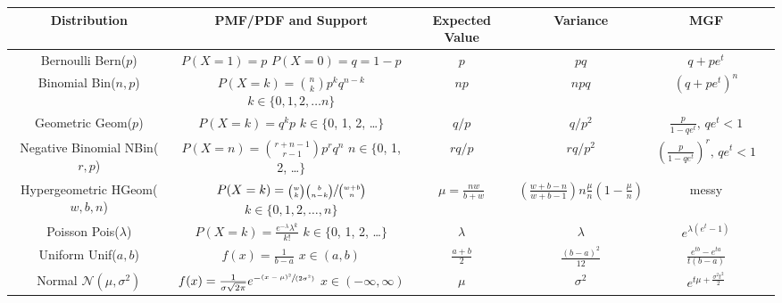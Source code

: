 \documentclass[10pt,landscape]{article}
\newcommand{\N}{\mathcal{N}}
\newcommand{\Bern}{\textrm{Bern}}
\newcommand{\Bin}{\textrm{Bin}}
\newcommand{\Pois}{\textrm{Pois}}
\newcommand{\Unif}{\textrm{Unif}}
\newcommand{\Geom}{\textrm{Geom}}
\newcommand{\NBin}{\textrm{NBin}}
\newcommand{\Hypergeometric}{\textrm{HGeom}}
\begin{document}
\begin{center}
\renewcommand{\arraystretch}{3.7}
\begin{tabular}{cccccc}
\textbf{Distribution} & \textbf{PMF/PDF and Support} & \textbf{Expected Value}  & \textbf{Variance} & \textbf{MGF}\\
\hline 
\shortstack{Bernoulli \\ \Bern($p$)} & \shortstack{$P(X=1) = p$ \\$ P(X=0) = q=1-p$} & $p$ & $pq$ & $q + pe^t$ \\
\hline
\shortstack{Binomial \\ \Bin($n, p$)} & \shortstack{$P(X=k) = {n \choose k}p^k q^{n-k}$  \\ $k \in \{0, 1, 2, \dots n\}$}& $np$ & $npq$ & $(q + pe^t)^n$ \\
\hline
\shortstack{Geometric \\ \Geom($p$)} & \shortstack{$P(X=k) = q^kp$  \\ $k \in \{$0, 1, 2, \dots $\}$}& $q/p$ & $q/p^2$ & $\frac{p}{1-qe^t}, \, qe^t < 1$\\
\hline
\shortstack{Negative Binomial \\ \NBin($r, p$)} & \shortstack{$P(X=n) = {r + n - 1 \choose r -1}p^rq^n$ \\ $n \in \{$0, 1, 2, \dots $\}$} & $rq/p$ & $rq/p^2$ &  $(\frac{p}{1-qe^t})^r, \, qe^t < 1$\\
\hline
\shortstack{Hypergeometric \\ \Hypergeometric($w, b, n$)} & \shortstack{$P(X=k) = \sfrac{{w \choose k}{b \choose n-k}}{{w + b \choose n}}$ \\ $k \in \{0, 1, 2, \dots,  n\}$} & $\mu = \frac{nw}{b+w}$ &$\left(\frac{w+b-n}{w+b-1} \right) n\frac{\mu}{n}(1 - \frac{\mu}{n})$& messy  \\
\hline
\shortstack{Poisson \\ \Pois($\lambda$)} & \shortstack{$P(X=k) = \frac{e^{-\lambda}\lambda^k}{k!}$ \\ $k \in \{$0, 1, 2, \dots $\}$} & $\lambda$ & $\lambda$ & $e^{\lambda(e^t-1)}$ \\
\hline
\hline
\shortstack{Uniform \\ \Unif($a, b$)} & \shortstack{$ f(x) = \frac{1}{b-a}$ \\$ x \in (a, b) $} & $\frac{a+b}{2}$ & $\frac{(b-a)^2}{12}$ &  $\frac{e^{tb}-e^{ta}}{t(b-a)}$\\
\hline
\shortstack{Normal \\ $\N(\mu, \sigma^2)$} & \shortstack{$f(x) = \frac{1}{\sigma \sqrt{2\pi}} e^{-\sfrac{(x - \mu)^2}{(2 \sigma^2)}}$ \\ $x \in (-\infty, \infty)$} & $\mu$  & $\sigma^2$ & $e^{t\mu + \frac{\sigma^2t^2}{2}}$\\

\end{tabular}
\end{center}
\end{document}
